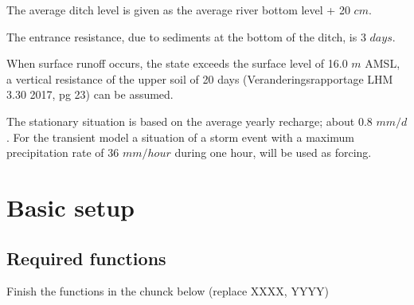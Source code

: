 \documentclass[
]{article}
\begin{document}
The average ditch level is given as the average river bottom level + 20
\(cm\).

The entrance resistance, due to sediments at the bottom of the ditch, is
3 \(days\).

When surface runoff occurs, the state exceeds the surface level of 16.0
\(m\) AMSL, a vertical resistance of the upper soil of 20 days
(Veranderingsrapportage LHM 3.30 2017, pg 23) can be assumed.

The stationary situation is based on the average yearly recharge; about
0.8 \(mm/d\). For the transient model a situation of a storm event with
a maximum precipitation rate of 36 \(mm/hour\) during one hour, will be
used as forcing.

\hypertarget{basic-setup}{%
\section{Basic setup}\label{basic-setup}}

\hypertarget{required-functions}{%
\subsection{Required functions}\label{required-functions}}

Finish the functions in the chunck below (replace XXXX, YYYY)
\end{document}
